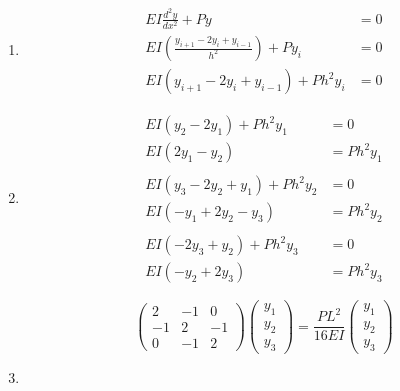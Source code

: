 \documentclass{article}
\begin{document}
\begin{enumerate}
  \item

        \begin{align*}
          E I \frac{d^2 y}{d x^2} + P y                                        & = 0 \\
          E I \left( \frac{y_{i + 1} - 2 y_i + y_{i - 1}}{h^2} \right) + P y_i & = 0 \\
          E I (y_{i + 1} - 2 y_i + y_{i - 1}) + P h^2 y_i                      & = 0
        \end{align*}

  \item

        \begin{align*}
          E I (y_2 - 2 y_1) + P h^2 y_1       & = 0         \\
          E I (2 y_1 - y_2)                   & = P h^2 y_1 \\ \\
          E I (y_3 - 2 y_2 + y_1) + P h^2 y_2 & = 0         \\
          E I (-y_1 + 2 y_2 - y_3)            & = P h^2 y_2 \\ \\
          E I (-2 y_3 + y_2) + P h^2 y_3      & = 0         \\
          E I (-y_2 + 2 y_3)                  & = P h^2 y_3
        \end{align*}

        \[\begin{pmatrix}
            2  & -1 & 0  \\
            -1 & 2  & -1 \\
            0  & -1 & 2
          \end{pmatrix} \begin{pmatrix}
            y_1 \\
            y_2 \\
            y_3
          \end{pmatrix} = \frac{P L^2}{16 E I} \begin{pmatrix}
            y_1 \\
            y_2 \\
            y_3
          \end{pmatrix}\]

  \item


\end{enumerate}
\end{document}
